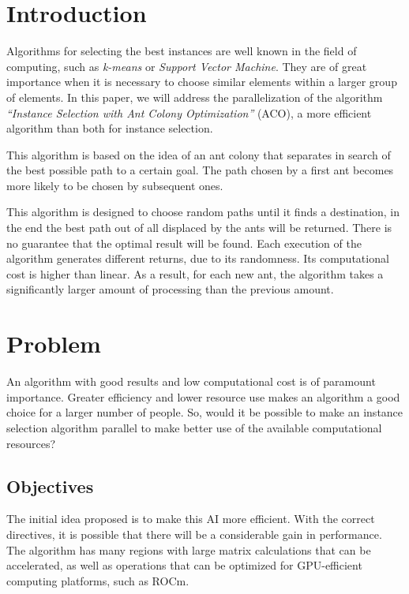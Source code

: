 \section{Introduction}

Algorithms for selecting the best instances are well known in the field of computing, such as \emph{k-means} or \emph{Support Vector Machine}. They are of great importance when it is necessary to choose similar elements within a larger group of elements. In this paper, we will address the parallelization of the algorithm \emph{``Instance Selection with Ant Colony Optimization''} (ACO), a more efficient algorithm than both for instance selection.

This algorithm is based on the idea of an ant colony that separates in search of the best possible path to a certain goal. The path chosen by a first ant becomes more likely to be chosen by subsequent ones.

This algorithm is designed to choose random paths until it finds a destination, in the end the best path out of all displaced by the ants will be returned. There is no guarantee that the optimal result will be found. Each execution of the algorithm generates different returns, due to its randomness. Its computational cost is higher than linear. As a result, for each new ant, the algorithm takes a significantly larger amount of processing than the previous amount.

\section{Problem}

An algorithm with good results and low computational cost is of paramount importance. Greater efficiency and lower resource use makes an algorithm a good choice for a larger number of people. So, would it be possible to make an instance selection algorithm parallel to make better use of the available computational resources?

\subsection{Objectives}

The initial idea proposed is to make this AI more efficient. With the correct directives, it is possible that there will be a considerable gain in performance. The algorithm has many regions with large matrix calculations that can be accelerated, as well as operations that can be optimized for GPU-efficient computing platforms, such as ROCm.


